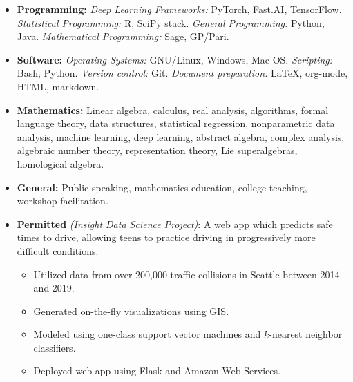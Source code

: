 \documentclass[10pt,a4paper]{article}
\begin{document}
{

\begin{itemize}
  \item \textbf{Programming:} \textit{Deep Learning Frameworks:} PyTorch, Fast.AI, TensorFlow. \textit{Statistical Programming:} R, SciPy stack. \textit{General Programming:} Python, Java. \textit{Mathematical Programming:} Sage, GP/Pari. 
  \item \textbf{Software:} \textit{Operating Systems:} GNU/Linux, Windows, Mac OS. \textit{Scripting:} Bash, Python. \textit{Version control:} Git. \textit{Document preparation:} \LaTeX, org-mode, HTML, markdown.
   \item \textbf{Mathematics:} Linear algebra, calculus, real analysis, algorithms, formal language theory, data structures, statistical regression, nonparametric data analysis, machine learning, deep learning, abstract algebra, complex analysis, algebraic number theory, representation theory, Lie superalgebras, homological algebra.
   \item \textbf{General:} Public speaking, mathematics education, college teaching, workshop facilitation.
 \end{itemize}

\spacedhrule{0.5em}{-0.4em}

\begin{itemize}
  \item \textbf{Permitted} \emph{(Insight Data Science Project)}: A web app which predicts safe times to drive, allowing teens to practice driving in progressively more difficult conditions.
  \begin{itemize}
    \item Utilized data from over 200,000 traffic collisions in Seattle between 2014 and 2019.
    \item Generated on-the-fly visualizations using GIS.
    \item Modeled using one-class support vector machines and $k$-nearest neighbor classifiers.
    \item Deployed web-app using Flask and Amazon Web Services.
  \end{itemize} 
\end{itemize}

}
\end{document}

